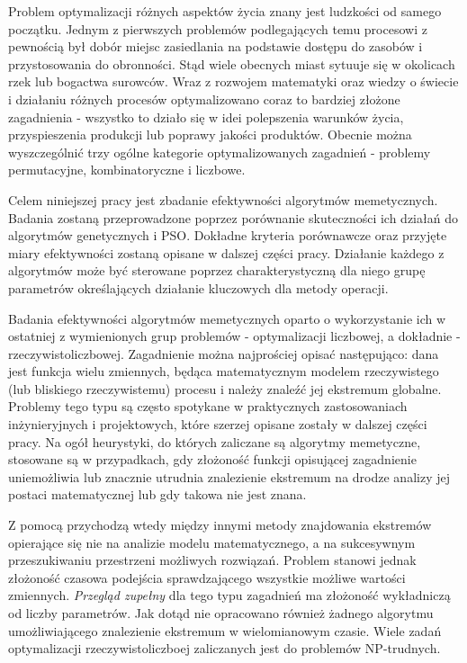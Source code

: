 \par
Problem optymalizacji różnych aspektów życia znany jest ludzkości od samego początku. Jednym z pierwszych problemów podlegających temu procesowi z pewnością był dobór miejsc zasiedlania na podstawie dostępu do zasobów i przystosowania do obronności. Stąd wiele obecnych miast sytuuje się w okolicach rzek lub bogactwa surowców. Wraz z rozwojem matematyki oraz wiedzy o świecie i działaniu różnych procesów optymalizowano coraz to bardziej złożone zagadnienia - wszystko to działo się w idei polepszenia warunków życia, przyspieszenia produkcji lub poprawy jakości produktów. Obecnie można wyszczególnić trzy ogólne kategorie optymalizowanych zagadnień - problemy permutacyjne, kombinatoryczne i liczbowe. 
\par
Celem niniejszej pracy jest zbadanie efektywności algorytmów memetycznych. Badania zostaną przeprowadzone poprzez porównanie skuteczności ich działań do algorytmów genetycznych i PSO. Dokładne kryteria porównawcze oraz przyjęte miary efektywności zostaną opisane w dalszej części pracy. Działanie każdego z algorytmów może być sterowane poprzez charakterystyczną dla niego grupę parametrów określających działanie kluczowych dla metody operacji. 
\par
Badania efektywności algorytmów memetycznych oparto o wykorzystanie ich w ostatniej z wymienionych grup problemów - optymalizacji liczbowej, a dokładnie - rzeczywistoliczbowej. Zagadnienie można najprościej opisać następująco: dana jest funkcja wielu zmiennych, będąca matematycznym modelem rzeczywistego (lub bliskiego rzeczywistemu) procesu i należy znaleźć jej ekstremum globalne. Problemy tego typu są często spotykane w praktycznych zastosowaniach inżynieryjnych i projektowych, które szerzej opisane zostały w dalszej części pracy. Na ogół heurystyki, do których zaliczane są algorytmy memetyczne, stosowane są w przypadkach, gdy złożoność funkcji opisującej zagadnienie uniemożliwia lub znacznie utrudnia znalezienie ekstremum na drodze analizy jej postaci matematycznej lub gdy takowa nie jest znana. 
\par
Z pomocą przychodzą wtedy między innymi metody znajdowania ekstremów opierające się nie na analizie modelu matematycznego, a na sukcesywnym przeszukiwaniu przestrzeni możliwych rozwiązań. Problem stanowi jednak złożoność czasowa podejścia sprawdzającego wszystkie możliwe wartości zmiennych. \emph{Przegląd zupełny} dla tego typu zagadnień ma złożoność wykładniczą od liczby parametrów. Jak dotąd nie opracowano również żadnego algorytmu umożliwiającego znalezienie ekstremum w wielomianowym czasie. Wiele zadań optymalizacji rzeczywistoliczboej zaliczanych jest do problemów NP-trudnych.
